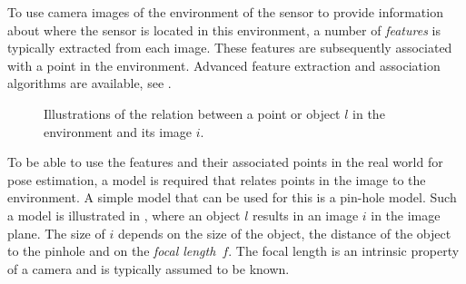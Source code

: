 To use camera images of the environment of the sensor to provide information about where the sensor is located in this environment, a number of \emph{features} is typically extracted from each image. These features are subsequently associated with a point in the environment. Advanced feature extraction and association algorithms are available, see \eg \cite{harrisS:1988,bayTG:2006,lowe:2004,fischlerB:1981}. 

\begin{figure}
  	\centering
    	\caption[]{Illustrations of the relation between a point or object $l$ in the environment and its image $i$.}
    	\label{fig:appl-vision}
\end{figure}

To be able to use the features and their associated points in the real world for pose estimation, a model is required that relates points in the image to the environment. A simple model that can be used for this is a pin-hole model. Such a model is illustrated in , where an object $l$ results in an image $i$ in the image plane. The size of $i$ depends on the size of the object, the distance of the object to the pinhole and on the \emph{focal length}~$f$. The focal length is an intrinsic property of a camera and is typically assumed to be known. 

